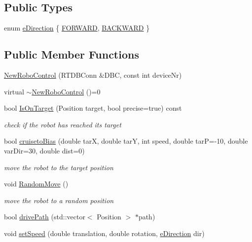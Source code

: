 \subsection*{Public Types}
\begin{DoxyCompactItemize}
\item 
enum \hyperlink{classNewRoboControl_a077fa253b827c190e82c1ce1e4c8d18f}{eDirection} \{ \hyperlink{classNewRoboControl_a077fa253b827c190e82c1ce1e4c8d18fac7af9b70b7504bd260f486172de934d9}{FORWARD}, 
\hyperlink{classNewRoboControl_a077fa253b827c190e82c1ce1e4c8d18faa55a679c9e8fbc7400c88ce3cab09c48}{BACKWARD}
 \}
\end{DoxyCompactItemize}
\subsection*{Public Member Functions}
\begin{DoxyCompactItemize}
\item 
\hyperlink{classNewRoboControl_a81f7ad52f88ea8fb90eeff5650efa1c5}{NewRoboControl} (RTDBConn \&DBC, const int deviceNr)
\item 
virtual \hyperlink{classNewRoboControl_ae63cbd6c60d37882d176e9e7d60b11ba}{$\sim$NewRoboControl} ()=0
\item 
bool \hyperlink{classNewRoboControl_a77b0e86bef15f3b1fb6cf98d91c6a9b4}{IsOnTarget} (Position target, bool precise=true) const 
\begin{DoxyCompactList}\small\item\em check if the robot has reached its target \item\end{DoxyCompactList}\item 
bool \hyperlink{classNewRoboControl_a30944b8982d85ab2ee83fd248b731bc0}{cruisetoBias} (double tarX, double tarY, int speed, double tarP=-\/10, double varDir=30, double dist=0)
\begin{DoxyCompactList}\small\item\em move the robot to the target position \item\end{DoxyCompactList}\item 
void \hyperlink{classNewRoboControl_ab3231acd7efd60677b4f48b094cb6dd3}{RandomMove} ()
\begin{DoxyCompactList}\small\item\em move the robot to a random position \item\end{DoxyCompactList}\item 
bool \hyperlink{classNewRoboControl_a9816eae1b7c90dbb74a7e0365e2b57e9}{drivePath} (std::vector$<$ Position $>$ $\ast$path)
\item 
void \hyperlink{classNewRoboControl_ad2ddddb5f0272a733021524ebaaaeffd}{setSpeed} (double translation, double rotation, \hyperlink{classNewRoboControl_a077fa253b827c190e82c1ce1e4c8d18f}{eDirection} dir)
\end{DoxyCompactItemize}
